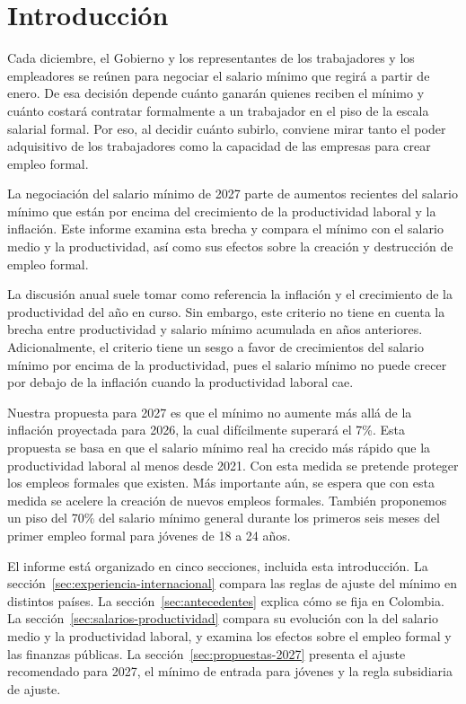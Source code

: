 \section{Introducción}

Cada diciembre, el Gobierno y los representantes de los trabajadores y los empleadores se reúnen para negociar el salario mínimo que regirá a partir de enero. De esa decisión depende cuánto ganarán quienes reciben el mínimo y cuánto costará contratar formalmente a un trabajador en el piso de la escala salarial formal. Por eso, al decidir cuánto subirlo, conviene mirar tanto el poder adquisitivo de los trabajadores como la capacidad de las empresas para crear empleo formal.

La negociación del salario mínimo de 2027 parte de aumentos recientes del salario mínimo que están por encima del crecimiento de la productividad laboral y la inflación. Este informe examina esta brecha y compara el mínimo con el salario medio y la productividad, así como sus efectos sobre la creación y destrucción de empleo formal.

La discusión anual suele tomar como referencia la inflación y el crecimiento de la productividad del año en curso. Sin embargo, este criterio no tiene en cuenta la brecha entre productividad y salario mínimo acumulada en años anteriores. Adicionalmente, el criterio tiene un sesgo a favor de crecimientos del salario mínimo por encima de la productividad, pues el salario mínimo no puede crecer por debajo de la inflación cuando la productividad laboral cae.

Nuestra propuesta para 2027 es que el mínimo no aumente más allá de la inflación proyectada para 2026, la cual difícilmente superará el 7\%. Esta propuesta se basa en que el salario mínimo real ha crecido más rápido que la productividad laboral al menos desde 2021. Con esta medida se pretende proteger los empleos formales que existen. Más importante aún, se espera que con esta medida  se acelere la creación de nuevos empleos formales. También proponemos un piso del 70\% del salario mínimo general durante los primeros seis meses del primer empleo formal para jóvenes de 18 a 24 años.

El informe está organizado en cinco secciones, incluida esta introducción. La sección~\ref{sec:experiencia-internacional} compara las reglas de ajuste del mínimo en distintos países. La sección~\ref{sec:antecedentes} explica cómo se fija en Colombia. La sección~\ref{sec:salarios-productividad} compara su evolución con la del salario medio y la productividad laboral, y examina los efectos sobre el empleo formal y las finanzas públicas. La sección~\ref{sec:propuestas-2027} presenta el ajuste recomendado para 2027, el mínimo de entrada para jóvenes y la regla subsidiaria de ajuste.

